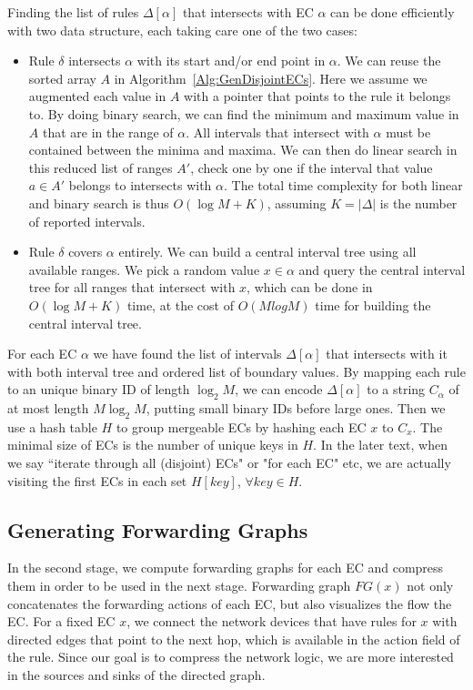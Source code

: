 Finding the list of rules $\Delta[\alpha]$ that intersects with EC $\alpha$ can be done
efficiently with two data structure,
each taking care one of the two cases\cite{FindIntersectionWiki}:
\begin{itemize}
\item Rule $\delta$ intersects $\alpha$ with its start and/or end point in $\alpha$.
        We can reuse the sorted array $A$ in Algorithm~\ref{Alg:GenDisjointECs}.
        Here we assume we augmented each value in $A$ with a pointer that points to
        the rule it belongs to.
        By doing binary search, we can find the minimum and maximum value in $A$ that
        are in the range of $\alpha$.
        All intervals that intersect with $\alpha$ must be contained between
        the minima and maxima.
        We can then do linear search in this reduced list of ranges $A'$,
        check one by one if the interval that value $a\in A'$ belongs to
        intersects with $\alpha$.
        The total time complexity for both linear and binary search is thus $O(\log M + K)$,
        assuming $K=|\Delta|$ is the number of reported intervals.
\item Rule $\delta$ covers $\alpha$ entirely. We can build
        a central interval tree\cite{ComputationalGeometryBook} using all available ranges.
        We pick a random value $x \in \alpha$ and query the central interval tree for
        all ranges that intersect with $x$, which can be done in $O(\log M + K)$ time,
        at the cost of $O(M log M)$ time for building the central interval tree. 
\end{itemize}

For each EC $\alpha$ we have found the list of intervals $\Delta[\alpha]$
that intersects with it with both interval tree and ordered list of boundary values.
By mapping each rule to an unique binary ID of length $\log_2 M$,
we can encode $\Delta[\alpha]$ to a string $C_\alpha$ of at most length $M\log_2 M$, putting
small binary IDs before large ones.
Then we use a hash table $H$ to group mergeable ECs by hashing each EC $x$ to $C_x$.
The minimal size of ECs is the number of unique keys in $H$.
In the later text, when we say ``iterate through all (disjoint) ECs" or "for each EC" etc,
we are actually visiting the first ECs in each set $H[key]$, $\forall key \in H$.


\subsection{Generating Forwarding Graphs}
In the second stage, we compute forwarding graphs for each EC and
compress them in order to be used in the next stage.
Forwarding graph $FG(x)$ not only concatenates the forwarding actions of each EC,
but also visualizes the flow the EC.
For a fixed EC $x$, we connect the network devices that have rules for $x$
with directed edges that point to the next hop,
which is available in the action field of the rule.
Since our goal is to compress the network logic, we are more interested in the sources
and sinks of the directed graph.

